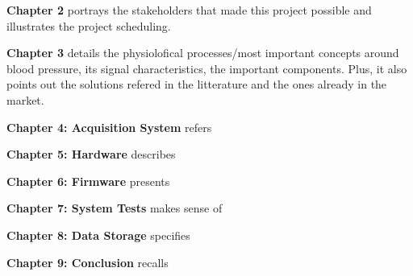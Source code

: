 \textbf {Chapter 2} portrays the stakeholders that made this project possible and illustrates the project scheduling.

\textbf {Chapter 3} details the physiolofical processes/most important concepts around blood pressure, its signal characteristics, the important components. Plus, it also points out the solutions refered in the litterature and the ones already in the market.

\textbf {Chapter 4: Acquisition System} refers

\textbf {Chapter 5: Hardware} describes

\textbf {Chapter 6: Firmware} presents

\textbf {Chapter 7: System Tests} makes sense of

\textbf {Chapter 8: Data Storage} specifies

\textbf {Chapter 9: Conclusion} recalls
